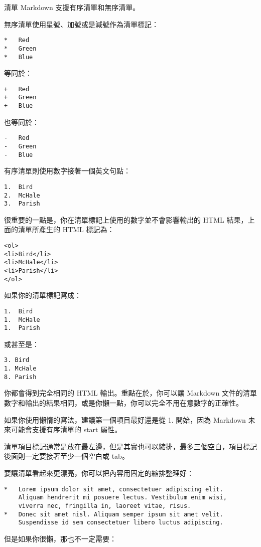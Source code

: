 清單
Markdown 支援有序清單和無序清單。

無序清單使用星號、加號或是減號作為清單標記：

\begin{verbatim}
*   Red
*   Green
*   Blue
\end{verbatim}
等同於：

\begin{verbatim}
+   Red
+   Green
+   Blue
\end{verbatim}
也等同於：

\begin{verbatim}
-   Red
-   Green
-   Blue
\end{verbatim}
有序清單則使用數字接著一個英文句點：

\begin{verbatim}
1.  Bird
2.  McHale
3.  Parish
\end{verbatim}
很重要的一點是，你在清單標記上使用的數字並不會影響輸出的 HTML
結果，上面的清單所產生的 HTML 標記為：

\begin{verbatim}
<ol>
<li>Bird</li>
<li>McHale</li>
<li>Parish</li>
</ol>
\end{verbatim}
如果你的清單標記寫成：

\begin{verbatim}
1.  Bird
1.  McHale
1.  Parish
\end{verbatim}
或甚至是：

\begin{verbatim}
3. Bird
1. McHale
8. Parish
\end{verbatim}
你都會得到完全相同的 HTML 輸出。重點在於，你可以讓 Markdown
文件的清單數字和輸出的結果相同，或是你懶一點，你可以完全不用在意數字的正確性。

如果你使用懶惰的寫法，建議第一個項目最好還是從 1. 開始，因為 Markdown
未來可能會支援有序清單的 start 屬性。

清單項目標記通常是放在最左邊，但是其實也可以縮排，最多三個空白，項目標記後面則一定要接著至少一個空白或
tab。

要讓清單看起來更漂亮，你可以把內容用固定的縮排整理好：

\begin{verbatim}
*   Lorem ipsum dolor sit amet, consectetuer adipiscing elit.
    Aliquam hendrerit mi posuere lectus. Vestibulum enim wisi,
    viverra nec, fringilla in, laoreet vitae, risus.
*   Donec sit amet nisl. Aliquam semper ipsum sit amet velit.
    Suspendisse id sem consectetuer libero luctus adipiscing.
\end{verbatim}
但是如果你很懶，那也不一定需要：

